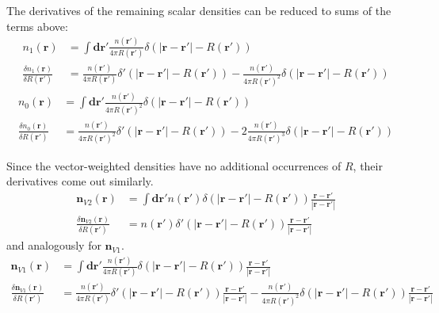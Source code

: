 \documentclass[letterpaper,twocolumn,amsmath,amssymb,prb]{revtex4-1}
\begin{document}
The derivatives of the remaining scalar densities can be reduced to
sums of the terms above:
\begin{align}
  n_1(\mathbf{r}) &= \int \mathbf{dr'} \frac{n(\mathbf{r'})}{4\pi R(\mathbf{r'})}
  \delta(|\mathbf{r}-\mathbf{r'}| - R(\mathbf{r'})) \\
  \frac{\delta n_1(\mathbf{r})}{\delta R(\mathbf{r}')}
  &= \frac{n(\mathbf{r'})}{4\pi
    R(\mathbf{r'})}\delta'(|\mathbf{r}-\mathbf{r'}| - R(\mathbf{r'}))
  -
  \frac{n(\mathbf{r'})}{4\pi
    R(\mathbf{r'})^2}\delta(|\mathbf{r}-\mathbf{r'}| - R(\mathbf{r'}))
\end{align}
\begin{align}
  n_0(\mathbf{r}) &= \int \mathbf{dr'} \frac{n(\mathbf{r'})}{4\pi R(\mathbf{r'})^2}
  \delta(|\mathbf{r}-\mathbf{r'}| - R(\mathbf{r'})) \\
  \frac{\delta n_0(\mathbf{r})}{\delta R(\mathbf{r}')}
  &= \frac{n(\mathbf{r'})}{4\pi
    R(\mathbf{r'})^2}\delta'(|\mathbf{r}-\mathbf{r'}| - R(\mathbf{r'}))
  -2
  \frac{n(\mathbf{r'})}{4\pi
    R(\mathbf{r'})^3}\delta(|\mathbf{r}-\mathbf{r'}| - R(\mathbf{r'}))
\end{align}

Since the vector-weighted densities have no additional occurrences of
$R$, their derivatives come out similarly.
\begin{align}
  \mathbf{n}_{V2}(\mathbf{r}) &= \int \mathbf{dr'} n(\mathbf{r'})
  \delta(|\mathbf{r}-\mathbf{r'}| - R(\mathbf{r'}))\frac{\mathbf{r}-\mathbf{r'}}{|\mathbf{r}-\mathbf{r'}|} \\
  \frac{\delta \mathbf{n}_{V2}(\mathbf{r})}{\delta R(\mathbf{r}')}
  &= n(\mathbf{r'})\delta'(|\mathbf{r}-\mathbf{r'}| - R(\mathbf{r'}))
  \frac{\mathbf{r}-\mathbf{r'}}{|\mathbf{r}-\mathbf{r'}|}
\end{align}
and analogously for $\mathbf{n}_{V1}$.
\begin{align}
  \mathbf{n}_{V1}(\mathbf{r}) &= \int \mathbf{dr'}
  \frac{n(\mathbf{r'})}{4\pi R(\mathbf{r'})}
  \delta(|\mathbf{r}-\mathbf{r'}| - R(\mathbf{r'}))\frac{\mathbf{r}-\mathbf{r'}}{|\mathbf{r}-\mathbf{r'}|} \\
  \frac{\delta \mathbf{n}_{V1}(\mathbf{r})}{\delta R(\mathbf{r}')}
  &= \frac{n(\mathbf{r'})}{4\pi R(\mathbf{r'})}\delta'(|\mathbf{r}-\mathbf{r'}| - R(\mathbf{r'}))
  \frac{\mathbf{r}-\mathbf{r'}}{|\mathbf{r}-\mathbf{r'}|} -
  \frac{n(\mathbf{r'})}{4\pi R(\mathbf{r'})^2}\delta(|\mathbf{r}-\mathbf{r'}| - R(\mathbf{r'}))
  \frac{\mathbf{r}-\mathbf{r'}}{|\mathbf{r}-\mathbf{r'}|}
\end{align}
\end{document}
